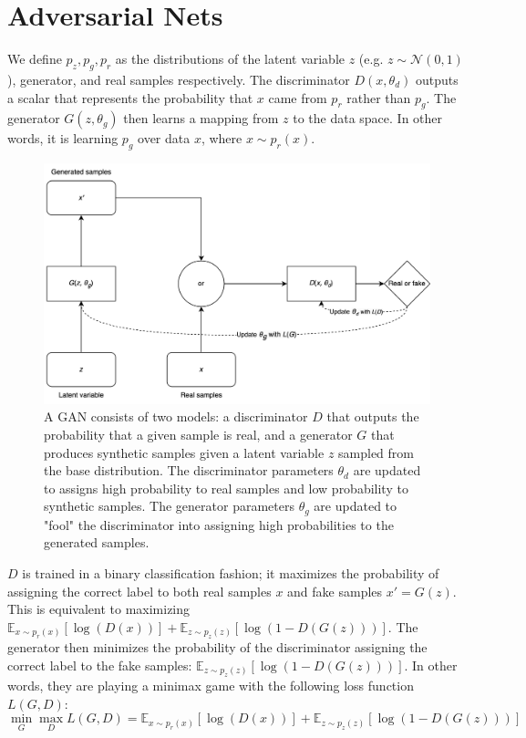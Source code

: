 \section{Adversarial Nets}
    We define $p_z, p_g, p_r$ as the distributions of the latent variable $z$ (e.g. $z \sim \mathcal{N}(0,1)$), generator, and real samples respectively. The discriminator $D(x,\theta_d)$ outputs a scalar that represents the probability that $x$ came from $p_r$ rather than $p_g$. The generator $G(z, \theta_g)$ then learns a mapping from $z$ to the data space. In other words, it is learning $p_g$ over data $x$, where $x\sim p_r(x)$.\par
    \begin{figure}[htbp]
        \centering
        \includegraphics[width=0.6\linewidth]{Graphics/adver_net.png}
        \caption{A GAN consists of two models: a discriminator $D$ that outputs the probability that a given sample is real, and a generator $G$ that produces synthetic samples given a latent variable $z$ sampled from the base distribution. The discriminator parameters $\theta_d$ are updated to assigns high probability to real samples and low probability to synthetic samples. The generator parameters $\theta_g$ are updated to "fool" the discriminator into assigning high probabilities to the generated samples.}
        \label{fig:adv_net}
    \end{figure}
    $D$ is trained in a binary classification fashion; it maximizes the probability of assigning the correct label to both real samples $x$ and fake samples $x' = G(z)$. This is equivalent to maximizing $\mathbb{E}_{x\sim p_r(x)}\left[\log (D(x))\right] +\mathbb{E}_{z\sim p_z(z)}\left[\log(1- D(G(z)))\right]$. The generator then minimizes the probability of the discriminator assigning the correct label to the fake samples: $\mathbb{E}_{z\sim p_z(z)}\left[\log(1- D(G(z)))\right]$. In other words, they are playing a minimax game with the following loss function $L(G, D)$:
    \begin{equation}
        \min_{G}\max_{D} L(G, D) = \mathbb{E}_{x\sim p_r(x)}\left[\log (D(x))\right] +\mathbb{E}_{z\sim p_z(z)}\left[\log(1- D(G(z)))\right]
    \end{equation}
